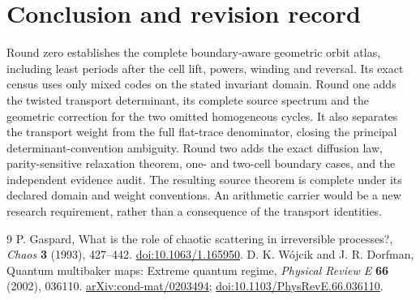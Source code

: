 \documentclass[10pt]{article}
\begin{document}
\section{Conclusion and revision record}
\ifcase\CRevisionRound
Round zero establishes the complete boundary-aware geometric orbit atlas,
including least periods after the cell lift, powers, winding and reversal.
Its exact census uses only mixed codes on the stated invariant domain.
\or
Round one adds the twisted transport determinant, its complete source
spectrum and the geometric correction for the two omitted homogeneous
cycles. It also separates the transport weight from the full flat-trace
denominator, closing the principal determinant-convention ambiguity.
\else
Round two adds the exact diffusion law, parity-sensitive relaxation theorem,
one- and two-cell boundary cases, and the independent evidence audit.
The resulting source theorem is complete under its declared domain and
weight conventions. An arithmetic carrier would be a new research
requirement, rather than a consequence of the transport identities.
\fi

\begin{thebibliography}{9}
 P. Gaspard, What is the role of chaotic scattering in
irreversible processes?, \emph{Chaos} \textbf{3} (1993), 427--442.
\href{https://doi.org/10.1063/1.165950}{doi:10.1063/1.165950}.
 D. K. W\'ojcik and J. R. Dorfman, Quantum multibaker maps:
Extreme quantum regime, \emph{Physical Review E} \textbf{66} (2002), 036110.
\href{https://arxiv.org/abs/cond-mat/0203494}{arXiv:cond-mat/0203494};
\href{https://doi.org/10.1103/PhysRevE.66.036110}{doi:10.1103/PhysRevE.66.036110}.
\end{thebibliography}
\end{document}
